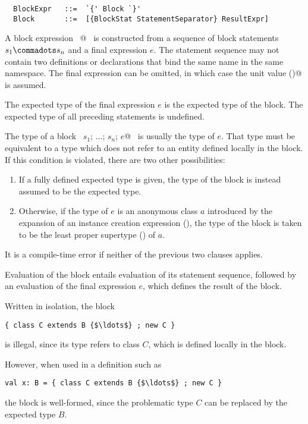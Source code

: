 \syntax\begin{lstlisting}
  BlockExpr   ::=  `{' Block `}'
  Block       ::=  [{BlockStat StatementSeparator} ResultExpr]
\end{lstlisting}

A block expression ~@~ is
constructed from a sequence of block statements $s_1 \commadots s_n$
and a final expression $e$.  The statement sequence may not contain
two definitions or declarations that bind the same name in the same
namespace.  The final expression can be omitted, in which
case the unit value \lstinline@()@ is assumed.


The expected type of the final expression $e$ is the expected
type of the block. The expected type of all preceding statements is
undefined.

The type of a block ~\lstinline@$s_1$; $\ldots$; $s_n$; $e$@~ is
usually the type of $e$.  That type must be equivalent to a type which
does not refer to an entity defined locally in the block. If this
condition is violated, there are two other possibilities:
\begin{enumerate}
\item
If a fully defined expected type is given, the
type of the block is instead assumed to be the expected type.
\item 
Otherwise, if the type of $e$ is an anonymous class $a$ introduced by the
expansion of an instance creation expression
(), the type of the block is taken to be the 
least proper supertype () of $a$.
\end{enumerate}
It is a compile-time error if neither of the previous two clauses applies.

Evaluation of the block entails evaluation of its
statement sequence, followed by an evaluation of the final expression
$e$, which defines the result of the block.

\example
Written in isolation, 
the block 
\begin{lstlisting}
{ class C extends B {$\ldots$} ; new C }
\end{lstlisting}
is illegal, since its type
refers to class $C$, which is defined locally in the block.

However, when used in a definition such as 
\begin{lstlisting}
val x: B = { class C extends B {$\ldots$} ; new C }
\end{lstlisting}
the block is well-formed, since the problematic type $C$ can be
replaced by the expected type $B$.

